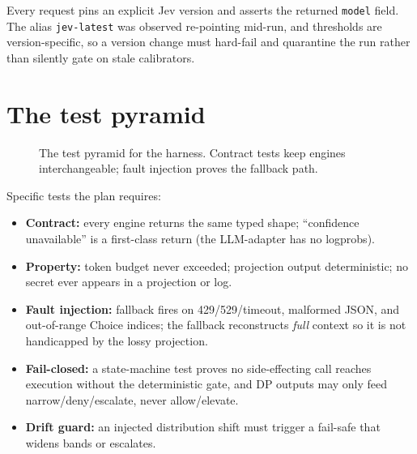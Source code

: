 Every request pins an explicit Jev version and asserts the returned \texttt{model} field.
The alias \texttt{jev-latest} was observed re-pointing mid-run, and thresholds are
version-specific, so a version change must hard-fail and quarantine the run rather than
silently gate on stale calibrators.

\section{The test pyramid}

\begin{figure}[h]\centering
{}
\caption{The test pyramid for the harness. Contract tests keep engines interchangeable;
fault injection proves the fallback path.}
\label{fig:pyramid}
\end{figure}

Specific tests the plan requires:
\begin{itemize}[itemsep=1pt]
  \item \textbf{Contract:} every engine returns the same typed shape; ``confidence
    unavailable'' is a first-class return (the LLM-adapter has no logprobs).
  \item \textbf{Property:} token budget never exceeded; projection output deterministic; no
    secret ever appears in a projection or log.
  \item \textbf{Fault injection:} fallback fires on 429/529/timeout, malformed JSON, and
    out-of-range Choice indices; the fallback reconstructs \emph{full} context so it is not
    handicapped by the lossy projection.
  \item \textbf{Fail-closed:} a state-machine test proves no side-effecting call reaches
    execution without the deterministic gate, and DP outputs may only feed
    narrow/deny/escalate, never allow/elevate.
  \item \textbf{Drift guard:} an injected distribution shift must trigger a fail-safe that
    widens bands or escalates.
\end{itemize}

